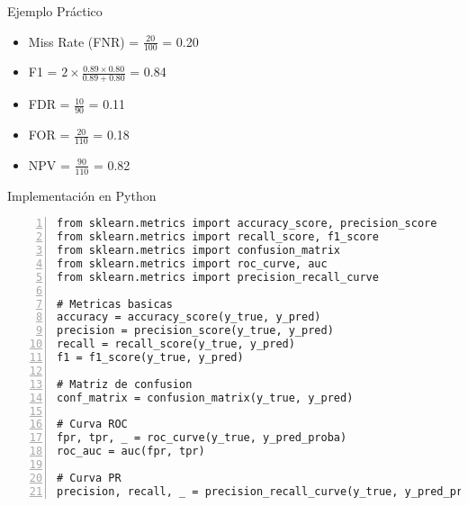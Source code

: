 \documentclass{beamer}
\begin{document}
\begin{frame}{Ejemplo Práctico}
    \begin{center}
    \end{center}
    
    \begin{itemize}
        \item Miss Rate (FNR) = $\frac{20}{100}$ = 0.20
        \item F1 = $2 \times \frac{0.89 \times 0.80}{0.89 + 0.80}$ = 0.84
        \item FDR = $\frac{10}{90}$ = 0.11
        \item FOR = $\frac{20}{110}$ = 0.18
        \item NPV = $\frac{90}{110}$ = 0.82
    \end{itemize}
\end{frame}

\begin{frame}[fragile]{Implementación en Python}
    \begin{lstlisting}[numbers=left, numbersep=5pt]
from sklearn.metrics import accuracy_score, precision_score
from sklearn.metrics import recall_score, f1_score
from sklearn.metrics import confusion_matrix
from sklearn.metrics import roc_curve, auc
from sklearn.metrics import precision_recall_curve

# Metricas basicas
accuracy = accuracy_score(y_true, y_pred)
precision = precision_score(y_true, y_pred)
recall = recall_score(y_true, y_pred)
f1 = f1_score(y_true, y_pred)

# Matriz de confusion
conf_matrix = confusion_matrix(y_true, y_pred)

# Curva ROC
fpr, tpr, _ = roc_curve(y_true, y_pred_proba)
roc_auc = auc(fpr, tpr)

# Curva PR
precision, recall, _ = precision_recall_curve(y_true, y_pred_proba)

\end{lstlisting}
\end{frame}
\end{document}

